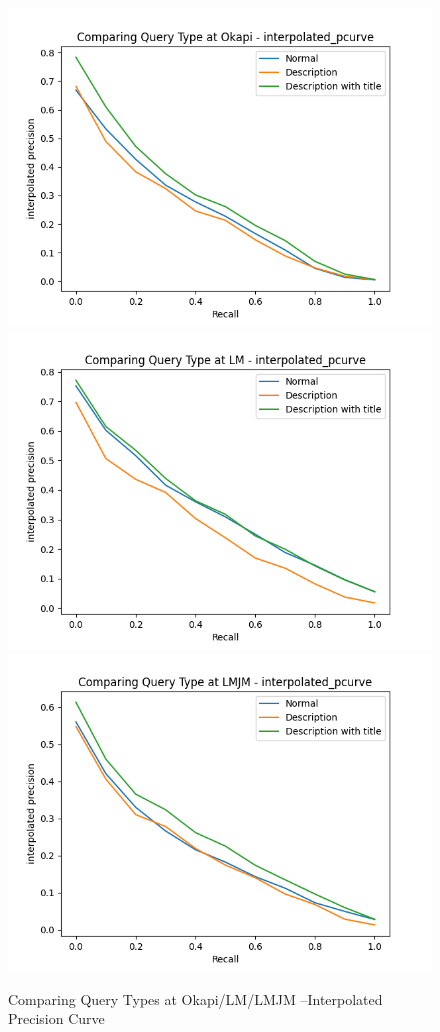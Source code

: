 \documentclass[10pt, a4paper]{article}
\begin{document}
\begin{figure}[h!]
\centering
\includegraphics[scale=0.3]{compare query/Comparing Query Type at Okapi - interpolated_pcurve-ipd.png}
\includegraphics[scale=0.3]{compare query/Comparing Query Type at LM - interpolated_pcurve-ipd.png}
\includegraphics[scale=0.3]{compare query/Comparing Query Type at LMJM - interpolated_pcurve-ipd.png}
\caption{Comparing Query Types at Okapi/LM/LMJM --Interpolated Precision Curve}
\label{fig:q_i}
\end{figure}
\end{document}
